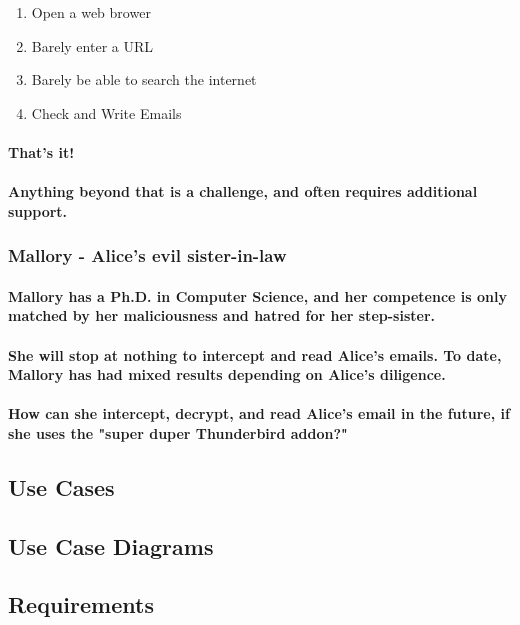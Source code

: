 \documentclass[12pt,a4paper]{article}
\begin{document}
\begin{enumerate}
\item Open a web brower
\item Barely enter a URL 
\item Barely be able to search the internet
\item Check and Write Emails
\end{enumerate}

\paragraph{That's it!}
\paragraph{Anything beyond that is a challenge, and often requires additional support.}

\subsubsection{Mallory - Alice's evil sister-in-law}
\paragraph{Mallory has a Ph.D. in Computer Science, and her competence is only matched by her maliciousness and hatred for her step-sister.}
\paragraph{She will stop at nothing to intercept and read Alice's emails. To date, Mallory has had mixed results depending on Alice's diligence.}
\paragraph{How can she intercept, decrypt, and read Alice's email in the future, if she uses the "super duper Thunderbird addon?"}

\subsection{Use Cases}
\subsection{Use Case Diagrams}
\subsection{Requirements}
\end{document}
